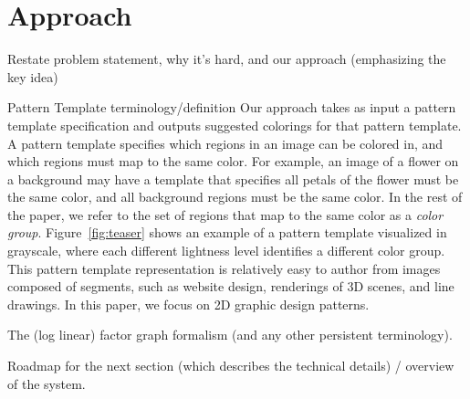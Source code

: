 \section{Approach}
\label{sec:approach}


Restate problem statement, why it's hard, and our approach (emphasizing the key idea)~

Pattern Template terminology/definition
Our approach takes as input a pattern template specification and outputs suggested colorings for that pattern template. A pattern template specifies which regions in an image can be colored in, and which regions must map to the same color. For example, an image of a flower on a background may have a template that specifies all petals of the flower must be the same color, and all background regions must be the same color. In the rest of the paper, we refer to the set of regions that map to the same color as a \emph{color group}. Figure~\ref{fig:teaser} shows an example of a pattern template visualized in grayscale, where each different lightness level identifies a different color group. This pattern template representation is relatively easy to author from images composed of segments, such as website design, renderings of 3D scenes, and line drawings. In this paper, we focus on 2D graphic design patterns. 



The (log linear) factor graph formalism (and any other persistent terminology).






Roadmap for the next section (which describes the technical details) / overview of the system.